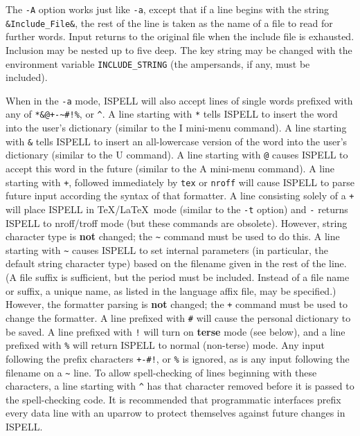 \documentclass[twoside,11pt]{article}
\begin{document}
\begin{itemize}
The \verb+-A+ option works just like \verb+-a+, except that if a line begins
with the string \verb+&Include_File&+, the rest of the line is taken as the
name of a file to read for further words.
Input returns to the original file when the include file is exhausted.
Inclusion may be nested up to five deep.
The key string may be changed with the environment variable
\verb+INCLUDE_STRING+ (the ampersands, if any, must be included).

When in the \verb+-a+ mode, ISPELL will also accept lines of single words
prefixed with any of \verb=*&@+-~#!%=, or \verb+^+\@.
A line starting with \verb+*+ tells ISPELL to insert the word into the user's
dictionary (similar to the I mini-menu command).
A line starting with \verb+&+ tells ISPELL to insert an all-lowercase version
of the word into the user's dictionary (similar to the U command).
A line starting with \verb+@+ causes ISPELL to accept this word in the future
(similar to the A mini-menu command).
A line starting with \verb-+-, followed immediately by \verb+tex+ or
\verb+nroff+ will cause ISPELL to parse future input according the syntax of
that formatter.
A line consisting solely of a \verb-+- will place ISPELL in \TeX /\LaTeX\ mode
(similar to the \verb+-t+ option) and \verb+-+ returns ISPELL to nroff/troff
mode (but these commands are obsolete).
However, string character type is {\bf not} changed; the \verb+~+ command
must be used to do this.
A line starting with \verb+~+ causes ISPELL to set internal parameters (in
particular, the default string character type) based on the filename given in
the rest of the line.
(A file suffix is sufficient, but the period must be included.
Instead of a file name or suffix, a unique name, as listed in the language
affix file, may be specified.)
However, the formatter parsing is {\bf not} changed; the \verb-+- command must
be used to change the formatter.
A line prefixed with \verb+#+ will cause the personal dictionary to be saved.
A line prefixed with \verb+!+ will turn on {\bf terse} mode (see below), and
a line prefixed with \verb+%+ will return ISPELL to normal (non-terse) mode.
Any input following the prefix characters \verb=+-#!=, or \verb+%+ is ignored,
as is any input following the filename on a \verb+~+ line.
To allow spell-checking of lines beginning with these characters, a line
starting with \verb+^+ has that character removed before it is passed to the
spell-checking code.
It is recommended that programmatic interfaces prefix every data line with an
uparrow to protect themselves against future changes in ISPELL\@.


\end{itemize}
\end{document}
